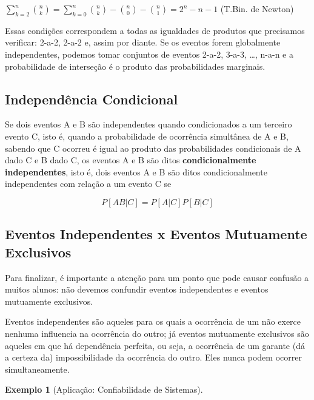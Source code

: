 \documentclass[
]{book}
\theoremstyle{definition}
\theoremstyle{definition}
\newtheorem{example}{Exemplo}[chapter]
\theoremstyle{definition}
\theoremstyle{remark}
\begin{document}
\({\sum_{k=2}^n \binom{n}{k} = \sum_{k=0}^n \binom{n}{k} - \binom{n}{0} - \binom{n}{1} = 2^n - n -1}\) (T.Bin. de Newton)

Essas condições correspondem a todas as igualdades de produtos que precisamos verificar: 2-a-2, 2-a-2 e, assim por diante. Se os eventos forem globalmente independentes, podemos tomar conjuntos de eventos 2-a-2, 3-a-3, \ldots, n-a-n e a probabilidade de interseção é o produto das probabilidades marginais.

\hypertarget{independuxeancia-condicional}{%
\subsection*{Independência Condicional}\label{independuxeancia-condicional}}

Se dois eventos A e B são independentes quando condicionados a um terceiro evento C, isto é, quando a probabilidade de ocorrência simultânea de A e B, sabendo que C ocorreu é igual ao produto das probabilidades condicionais de A dado C e B dado C, os eventos A e B são ditos \textbf{condicionalmente independentes}, isto é, dois eventos A e B são ditos condicionalmente independentes com relação a um evento C se

\[{P[AB|C] = P[A|C]P[B|C]}\]

\hypertarget{eventos-independentes-x-eventos-mutuamente-exclusivos}{%
\subsection*{Eventos Independentes x Eventos Mutuamente Exclusivos}\label{eventos-independentes-x-eventos-mutuamente-exclusivos}}

Para finalizar, é importante a atenção para um ponto que pode causar confusão a muitos alunos: não devemos confundir eventos independentes e eventos mutuamente exclusivos.

Eventos independentes são aqueles para os quais a ocorrência de um não exerce nenhuma influencia na ocorrência do outro; já eventos mutuamente exclusivos são aqueles em que há dependência perfeita, ou seja, a ocorrência de um garante (dá a certeza da) impossibilidade da ocorrência do outro. Eles nunca podem ocorrer simultaneamente.

\begin{example}[Aplicação: Confiabilidade de Sistemas]
\protect\hypertarget{exm:unnamed-chunk-4}{}{\label{exm:unnamed-chunk-4} {} }
\end{example}
\end{document}
